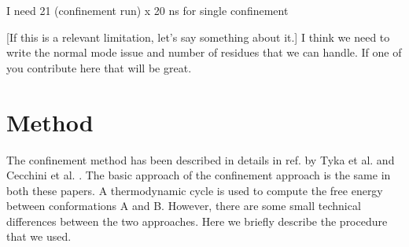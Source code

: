 \documentclass[12pt]{article}
\newcommand{\Arijit}[1]{\color{magenta}#1\normalcolor}
\newcommand{\Ken}[1]{\color{red}#1\normalcolor}
\begin{document}
\Arijit{I need 21 (confinement run) x 20 ns for single confinement}

\Ken{[If this is a relevant limitation, let's say something about it.]}
\Arijit{I think we need to write the normal mode issue and number of residues that we can handle. If 
one of you contribute here that will be great.}

\section{Method}

The confinement method has been described in details in ref. by Tyka et al. \cite{Tyka2006} and
Cecchini et  al. \cite{Cecchini2009}. The basic approach of the confinement approach is the same in
both these papers. A thermodynamic cycle is used to compute the free energy between conformations A
and B. However, there are some small technical differences between the two approaches. Here we briefly
describe the procedure that we used.
\end{document}
